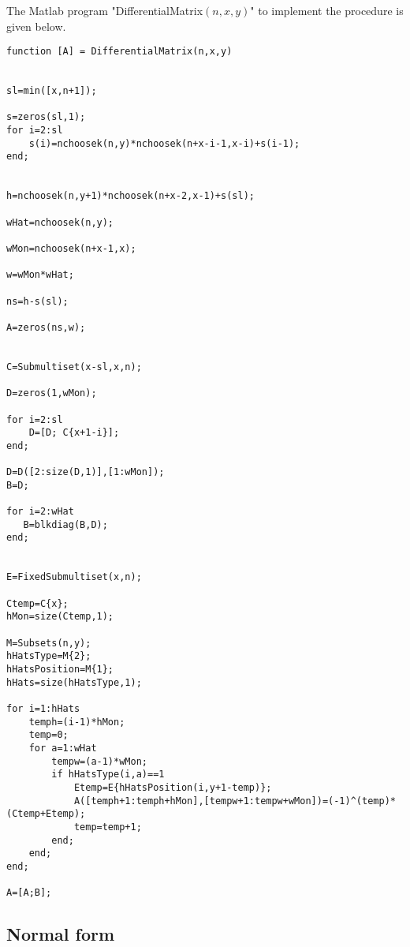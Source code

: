 \documentclass{article}
\theoremstyle{plain}
\theoremstyle{definition}
\numberwithin{thm}{section}
\begin{document}
				The Matlab program "DifferentialMatrix$(n,x,y)$" to implement the procedure is given below.
			
				\begin{lstlisting}[frame=single]
function [A] = DifferentialMatrix(n,x,y)
 
 
sl=min([x,n+1]); 
 
s=zeros(sl,1);
for i=2:sl
    s(i)=nchoosek(n,y)*nchoosek(n+x-i-1,x-i)+s(i-1);
end;
 
 
h=nchoosek(n,y+1)*nchoosek(n+x-2,x-1)+s(sl);
 
wHat=nchoosek(n,y);
 
wMon=nchoosek(n+x-1,x);
 
w=wMon*wHat;
 
ns=h-s(sl);
 
A=zeros(ns,w);
 
 
C=Submultiset(x-sl,x,n);
 
D=zeros(1,wMon);
 
for i=2:sl
    D=[D; C{x+1-i}];
end;
 
D=D([2:size(D,1)],[1:wMon]);
B=D;
 
for i=2:wHat
   B=blkdiag(B,D);
end;
 
 
E=FixedSubmultiset(x,n);
 
Ctemp=C{x};
hMon=size(Ctemp,1);
 
M=Subsets(n,y);
hHatsType=M{2};
hHatsPosition=M{1};
hHats=size(hHatsType,1);
 
for i=1:hHats
    temph=(i-1)*hMon;
    temp=0;
    for a=1:wHat
        tempw=(a-1)*wMon;
        if hHatsType(i,a)==1
            Etemp=E{hHatsPosition(i,y+1-temp)};
            A([temph+1:temph+hMon],[tempw+1:tempw+wMon])=(-1)^(temp)*(Ctemp+Etemp);
            temp=temp+1;
        end;
    end;
end;
 
A=[A;B];
				\end{lstlisting}

		
		\subsection{Normal form}\label{sec:NormalForm}
		
\end{document}
